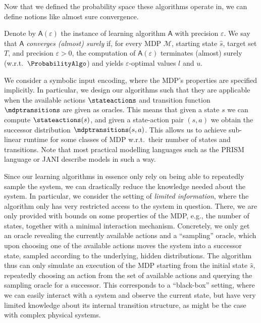 \documentclass{article}
\newcommand{\MDP}{\mathcal{M}}
\newcommand{\initialstate}{\hat{s}}
\newcommand{\learningalgo}{\mathsf{A}}
\begin{document}
Now that we defined the probability space these algorithms operate in, we can define notions like almost sure convergence.
\begin{definition}
	Denote by $\learningalgo(\varepsilon)$ the instance of learning algorithm $\learningalgo$ with precision $\varepsilon$.
	We say that $\learningalgo$ \emph{converges (almost) surely} if, for every MDP $\MDP$, starting state $\initialstate$, target set $T$, and precision $\varepsilon > 0$, the computation of $\learningalgo(\varepsilon)$ terminates (almost) surely (w.r.t.\ $\ProbabilityAlgo$) and yields $\varepsilon$-optimal values $l$ and $u$.
\end{definition}
We consider a symbolic input encoding, where the MDP's properties are specified implicitly.
In particular, we design our algorithms such that they are applicable when the available actions $\stateactions$ and transition function $\mdptransitions$ are given as oracles.
This means that given a state $s$ we can compute $\stateactions(s)$, and given a state-action pair $(s, a)$ we obtain the successor distribution $\mdptransitions(s, a)$.
This allows us to achieve sub-linear runtime for some classes of MDP w.r.t.\ their number of states and transitions.
Note that most practical modelling languages such as the PRISM language \cite{DBLP:conf/cav/KwiatkowskaNP11} or JANI \cite{DBLP:conf/tacas/BuddeDHHJT17} describe models in such a way.

Since our learning algorithms in essence only rely on being able to repeatedly sample the system, we can drastically reduce the knowledge needed about the system.
In particular, we consider the setting of \emph{limited information}, where the algorithm only has very restricted access to the system in question.
There, we are only provided with bounds on some properties of the MDP, e.g., the number of states, together with a minimal interaction mechanism.
Concretely, we only get an oracle revealing the currently available actions and a \enquote{sampling} oracle, which upon choosing one of the available actions moves the system into a successor state, sampled according to the underlying, hidden distributions.
The algorithm thus can only simulate an execution of the MDP starting from the initial state $\initialstate$, repeatedly choosing an action from the set of available actions and querying the sampling oracle for a successor.
This corresponds to a \enquote{black-box} setting, where we can easily interact with a system and observe the current state, but have very limited knowledge about its internal transition structure, as might be the case with complex physical systems.
\end{document}
